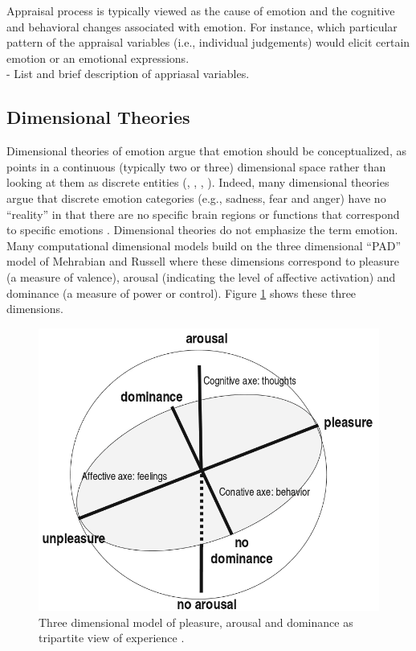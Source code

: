 \documentclass[11pt]{article}
\begin{document}
Appraisal process is typically viewed as the cause of emotion and the cognitive
and behavioral changes associated with emotion. For instance, which particular
pattern of the appraisal variables (i.e., individual judgements) would elicit
certain emotion or an emotional expressions.\\

- List and brief description of appriasal variables.

\subsection{Dimensional Theories}

Dimensional theories of emotion argue that emotion should be conceptualized, as
points in a continuous (typically two or three) dimensional space rather than
looking at them as discrete entities (\cite{carver:affect-behavior},
\cite{mehrabian-russell:pad}, \cite{russell:core-affect},
\cite{watson:consensual-structure-mood}). Indeed, many dimensional theories
argue that discrete emotion categories (e.g., sadness, fear and anger) have no
``reality'' in that there are no specific brain regions or functions that
correspond to specific emotions \cite{barrett:emotions-natural}. Dimensional
theories do not emphasize the term emotion. Many computational dimensional
models build on the three dimensional “PAD” model of Mehrabian and Russell
\cite{mehrabian-russell:pad} where these dimensions correspond to pleasure (a
measure of valence), arousal (indicating the level of affective activation) and
dominance (a measure of power or control). Figure \ref{fig:pad} shows these
three dimensions.

\begin{figure}[tbh]
  \center
  \includegraphics[width=.6\textwidth]{figure/dimensional2.png}
  \caption{Three dimensional model of pleasure, arousal and dominance as
  tripartite view of experience \cite{mehrabian:pad}.}
  \label{fig:pad}
\end{figure}
\end{document}
